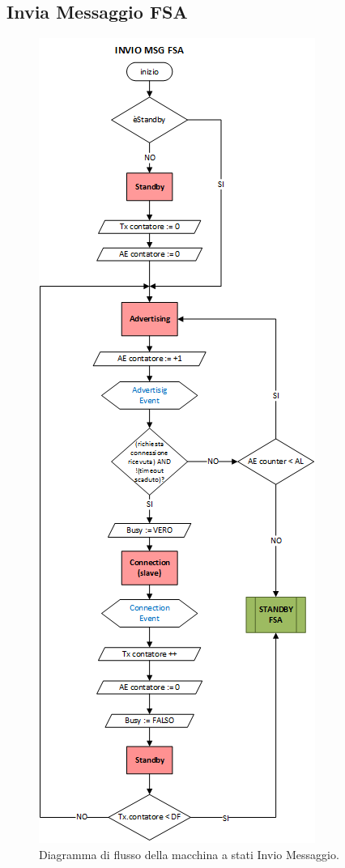 \subsection{Invia Messaggio FSA}
\label{apx:invio_fsa}
\begin{figure}[!h]
	\centering
	\includegraphics[height= 0.78\textheight]{Images/diagrammi_fsa/Invio_msg_fsa}
	\caption[Invio Messaggio fsa]{Diagramma di flusso della macchina a stati Invio Messaggio.}
	\label{fig:Invio_msg_fsa}
\end{figure}
\newpage

